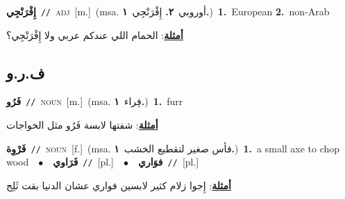 \documentclass[10pt,a4paper,twoside]{article} %
\begin{document}
\begin{multicols}{2}
{\setlength\topsep{0pt}\textbf{\foreignlanguage{arabic}{إِفْرَنْجِي}}\ {\color{gray}\texttt{//}\color{black}}\ \textsc{adj}\ [m.]\ \color{gray}(msa. \foreignlanguage{arabic}{أوروبي}~\foreignlanguage{arabic}{\textbf{٢.}}  \foreignlanguage{arabic}{إِفْرَنْجِي}~\foreignlanguage{arabic}{\textbf{١.}})\color{black}\ \textbf{1.}~European  \textbf{2.}~non-Arab\  \begin{flushright}\color{gray}\foreignlanguage{arabic}{\textbf{\underline{\foreignlanguage{arabic}{أمثلة}}}: الحمام اللي عندكم عربي ولا إِفْرَنْجِي؟}\end{flushright}\color{black}} \vspace{2mm}

\vspace{-3mm}
\subsection*{\color{blue}\foreignlanguage{arabic}{ف.ر.و}\color{blue}{}} 

{\setlength\topsep{0pt}\textbf{\foreignlanguage{arabic}{فَرُو}}\ {\color{gray}\texttt{//}\color{black}}\ \textsc{noun}\ [m.]\ \color{gray}(msa. \foreignlanguage{arabic}{فِراء}~\foreignlanguage{arabic}{\textbf{١.}})\color{black}\ \textbf{1.}~furr\  \begin{flushright}\color{gray}\foreignlanguage{arabic}{\textbf{\underline{\foreignlanguage{arabic}{أمثلة}}}: شفتها لابسة فَرُو  مثل الخواجات}\end{flushright}\color{black}} \vspace{2mm}

{\setlength\topsep{0pt}\textbf{\foreignlanguage{arabic}{فَرْوِة}}\ {\color{gray}\texttt{//}\color{black}}\ \textsc{noun}\ [f.]\ \color{gray}(msa. \foreignlanguage{arabic}{فأس صغير لتقطيع الخشب}~\foreignlanguage{arabic}{\textbf{١.}})\color{black}\ \textbf{1.}~a small axe to chop wood\ \ $\bullet$\ \ \setlength\topsep{0pt}\textbf{\foreignlanguage{arabic}{فَرَاوي}}\ {\color{gray}\texttt{//}\color{black}}\ [pl.]\ \ $\bullet$\ \ \setlength\topsep{0pt}\textbf{\foreignlanguage{arabic}{فوَاري}}\ {\color{gray}\texttt{//}\color{black}}\ [pl.]\  \begin{flushright}\color{gray}\foreignlanguage{arabic}{\textbf{\underline{\foreignlanguage{arabic}{أمثلة}}}: إِجوا زلام كثير لابسين فواري عشان الدنيا بقت ثَلِج}\end{flushright}\color{black}} \vspace{2mm}


\end{multicols}
\end{document}
